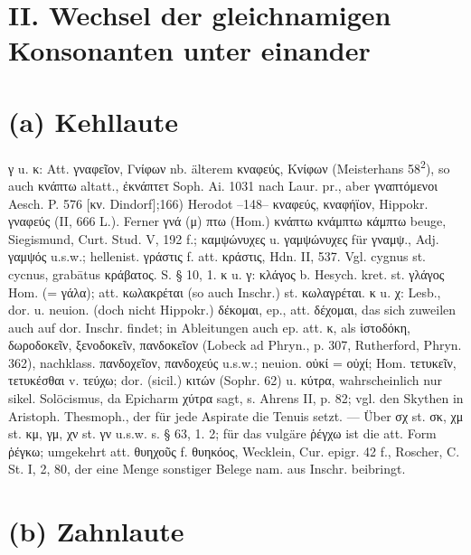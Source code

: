 \section*{II. Wechsel der gleichnamigen Konsonanten unter einander}
\section{(a) Kehllaute}
γ u. κ: Att. γναφεῖον, Γνίφων nb. älterem κναφεύς, Κνίφων (Meisterhans 58\textsuperscript{2}), so auch κνάπτω altatt., ἐκνάπτετ Soph. Ai. 1031 nach Laur. pr., aber γναπτόμενοι Aesch. P. 576 [κν. Dindorf];166) Herodot --148-- κναφεύς, κναφήϊον, Hippokr. γναφεύς (II, 666 L.). Ferner γνά (μ) πτω (Hom.) κνάπτω κνάμπτω κάμπτω beuge, Siegismund, Curt. Stud. V, 192 f.; καμψώνυχες u. γαμψώνυχες für γναμψ., Adj. γαμψός u.s.w.; hellenist. γράστις f. att. κράστις, Hdn. II, 537. Vgl. cygnus st. cycnus, grabātus κράβατος. S. § 10, 1. κ u. γ: κλάγος b. Hesych. kret. st. γλάγος Hom. (= γάλα); att. κωλακρέται (so auch Inschr.) st. κωλαγρέται. κ u. χ: Lesb., dor. u. neuion. (doch nicht Hippokr.) δέκομαι, ep., att. δέχομαι, das sich zuweilen auch auf dor. Inschr. findet; in Ableitungen auch ep. att. κ, als ἱστοδόκη, δωροδοκεῖν, ξενοδοκεῖν, πανδοκεῖον (Lobeck ad Phryn., p. 307, Rutherford, Phryn. 362), nachklass. πανδοχεῖον, πανδοχεύς u.s.w.; neuion. οὐκί = οὐχί; Hom. τετυκεῖν, τετυκέσθαι v. τεύχω; dor. (sicil.) κιτών (Sophr. 62) u. κύτρα, wahrscheinlich nur sikel. Solöcismus, da Epicharm χύτρα sagt, s. Ahrens II, p. 82; vgl. den Skythen in Aristoph. Thesmoph., der für jede Aspirate die Tenuis setzt. — Über σχ st. σκ, χμ st. κμ, γμ, χν st. γν u.s.w. s. § 63, 1. 2; für das vulgäre ῥέγχω ist die att. Form ῥέγκω; umgekehrt att. θυηχοῦς f. θυηκόος, Wecklein, Cur. epigr. 42 f., Roscher, C. St. I, 2, 80, der eine Menge sonstiger Belege nam. aus Inschr. beibringt.

\section{(b) Zahnlaute}


